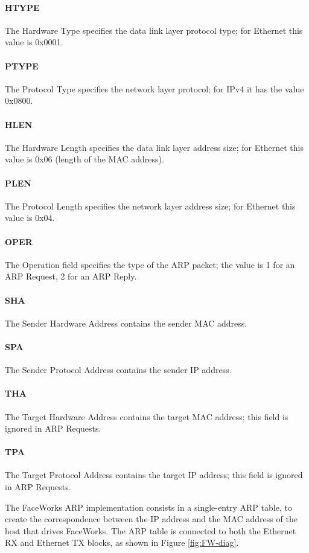 \documentclass[defaultstyle,10pt,master,Helvetica]{thesis}
\begin{document}
\paragraph*{HTYPE} The Hardware Type specifies the data link layer protocol type; for Ethernet this value is 0x0001.
\paragraph*{PTYPE} The Protocol Type specifies the network layer protocol; for IPv4 it has the value 0x0800.
\paragraph*{HLEN} The Hardware Length specifies the data link layer address size; for Ethernet this value is 0x06 (length of the \ac{MAC} address).
\paragraph*{PLEN} The Protocol Length specifies the network layer address size; for Ethernet this value is 0x04.
\paragraph*{OPER} The Operation field specifies the type of the \ac{ARP} packet; the value is 1 for an \ac{ARP} Request, 2 for an \ac{ARP} Reply.
\paragraph*{SHA} The Sender Hardware Address contains the sender \ac{MAC} address.
\paragraph*{SPA} The Sender Protocol Address contains the sender \ac{IP} address.
\paragraph*{THA} The Target Hardware Address contains the target \ac{MAC} address; this field is ignored in \ac{ARP} Requests.
\paragraph*{TPA} The Target Protocol Address contains the target \ac{IP} address; this field is ignored in \ac{ARP} Requests.

\vspace{0.5cm}
The FaceWorks \ac{ARP} implementation consists in a single-entry \ac{ARP} table, to create the correspondence between the \ac{IP} address and the \ac{MAC} address of the host that drives FaceWorks. The \ac{ARP} table is connected to both the Ethernet RX and Ethernet TX blocks, as shown in Figure \ref{fig:FW-diag}.
\end{document}

